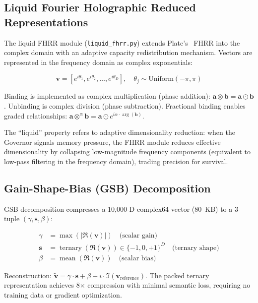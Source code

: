 \documentclass[11pt]{article}
\begin{document}
\subsection{Liquid Fourier Holographic Reduced Representations}

The liquid FHRR module (\texttt{liquid\_fhrr.py}) extends Plate's~\cite{plate2003holographic} FHRR into the complex domain with an adaptive capacity redistribution mechanism. Vectors are represented in the frequency domain as complex exponentials:

\begin{equation}
\mathbf{v} = [e^{i\theta_1}, e^{i\theta_2}, \ldots, e^{i\theta_D}], \quad \theta_j \sim \text{Uniform}(-\pi, \pi)
\end{equation}

Binding is implemented as complex multiplication (phase addition): $\mathbf{a} \otimes \mathbf{b} = \mathbf{a} \odot \mathbf{b}$. Unbinding is complex division (phase subtraction). Fractional binding enables graded relationships: $\mathbf{a} \otimes^{\alpha} \mathbf{b} = \mathbf{a} \odot e^{i\alpha \cdot \arg(\mathbf{b})}$.

The ``liquid'' property refers to adaptive dimensionality reduction: when the Governor signals memory pressure, the FHRR module reduces effective dimensionality by collapsing low-magnitude frequency components (equivalent to low-pass filtering in the frequency domain), trading precision for survival.

\subsection{Gain-Shape-Bias (GSB) Decomposition}

GSB decomposition compresses a 10,000-D complex64 vector (80~KB) to a 3-tuple $(\gamma, \mathbf{s}, \beta)$:

\begin{align}
\gamma &= \max(|\Re(\mathbf{v})|) \quad \text{(scalar gain)} \\
\mathbf{s} &= \operatorname{ternary}(\Re(\mathbf{v})) \in \{-1, 0, +1\}^{D} \quad \text{(ternary shape)} \\
\beta &= \operatorname{mean}(\Re(\mathbf{v})) \quad \text{(scalar bias)}
\end{align}

Reconstruction: $\tilde{\mathbf{v}} = \gamma \cdot \mathbf{s} + \beta + i \cdot \Im(\mathbf{v}_{\text{reference}})$. The packed ternary representation achieves 8$\times$ compression with minimal semantic loss, requiring no training data or gradient optimization.
\end{document}
